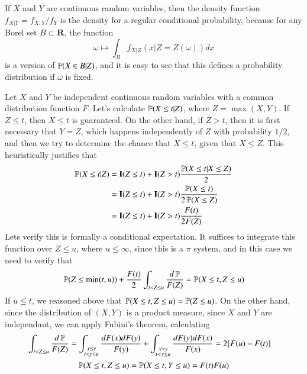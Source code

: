 \begin{example}
    If $X$ and $Y$ are continuous random variables, then the density function $f_{X|Y} = f_{X,Y}/f_Y$ is the density for a regular conditional probability, because for any Borel set $B \subset \mathbf{R}$, the function
    \[ \omega \mapsto \int_B f_{X|Z}(x|Z = Z(\omega)) dx \]
    is a version of $\operatorname{\mathbb{P}}(X \in B|Z)$, and it is easy to see that this defines a probability distribution if $\omega$ is fixed.
\end{example}

\begin{example}
    Let $X$ and $Y$ be independent continuous random variables with a common distribution function $F$. Let's calculate $\operatorname{\mathbb{P}}(X \leq t | Z)$, where $Z = \max(X,Y)$. If $Z \leq t$, then $X \leq t$ is guaranteed. On the other hand, if $Z > t$, then it is first necessary that $Y = Z$, which happens independently of $Z$ with probability $1/2$, and then we try to determine the chance that $X \leq t$, given that $X \leq Z$. This heuristically justifies that
    \begin{align*}
        \operatorname{\mathbb{P}}(X \leq t | Z) &= \mathbf{I}(Z \leq t) + \mathbf{I}(Z > t) \frac{\operatorname{\mathbb{P}}(X \leq t | X \leq Z)}{2} \\
        &= \mathbf{I}(Z \leq t) + \mathbf{I}(Z > t) \frac{\operatorname{\mathbb{P}}(X \leq t)}{2 \operatorname{\mathbb{P}}(X \leq Z)}\\
        &= \mathbf{I}(Z \leq t) + \mathbf{I}(Z > t) \frac{F(t)}{2 F(Z)}
    \end{align*}
    Lets verify this is formally a conditional expectation. It suffices to integrate this function over $Z \leq u$, where $u \leq \infty$, since this is a $\pi$ system, and in this case we need to verify that
    \[ \operatorname{\mathbb{P}}(Z \leq \min(t,u)) + \frac{F(t)}{2} \int_{t < Z \leq u} \frac{d\operatorname{\mathbb{P}}}{F(Z)} = \operatorname{\mathbb{P}}(X \leq t, Z \leq u) \]
    If $u \leq t$, we reasoned above that $\operatorname{\mathbb{P}}(X \leq t, Z \leq u) = \operatorname{\mathbb{P}}(Z \leq u)$. On the other hand, since the distribution of $(X,Y)$ is a product measure, since $X$ and $Y$ are independant, we can apply Fubini's theorem, calculating
    \begin{align*}
        \int_{t < Z \leq u} \frac{d\operatorname{\mathbb{P}}}{F(Z)} &= \int_{\substack{x \leq y\\t < y \leq u}} \frac{dF(x) dF(y)}{F(y)} + \int_{\substack{x > y\\t < x \leq u}} \frac{dF(y) dF(x)}{F(x)}= 2[F(u) - F(t)]
    \end{align*}
    \[ \operatorname{\mathbb{P}}(X \leq t, Z \leq u) = \operatorname{\mathbb{P}}(X \leq t, Y \leq u) = F(t)F(u) \]

\end{example}
